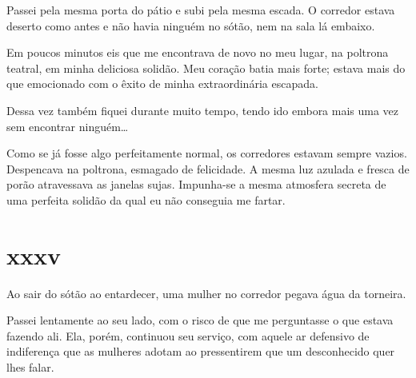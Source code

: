 
Passei pela mesma porta do pátio e subi pela mesma escada. O corredor estava
deserto como antes e não havia ninguém no sótão, nem na sala lá embaixo.

Em poucos minutos eis que me encontrava de novo no meu lugar, na poltrona
teatral, em minha deliciosa solidão. Meu coração batia mais forte; estava
mais do que emocionado com o êxito de minha extraordinária escapada.


Dessa vez também fiquei durante muito tempo, tendo ido embora mais uma vez sem
encontrar ninguém\ldots{}


Como se já fosse algo perfeitamente normal, os corredores estavam sempre
vazios. Despencava na poltrona, esmagado de felicidade. A mesma luz azulada e
fresca de porão atravessava as janelas sujas. Impunha-se a mesma atmosfera
secreta de uma perfeita solidão da qual eu não conseguia me fartar.


\section{xxxv} 


Ao sair do sótão ao entardecer, uma mulher no corredor pegava água da
torneira.

Passei lentamente ao seu lado, com o risco de que me perguntasse o que estava
fazendo ali. Ela, porém, continuou seu serviço, com aquele ar defensivo de
indiferença que as mulheres adotam ao pressentirem que um desconhecido quer
lhes falar.

